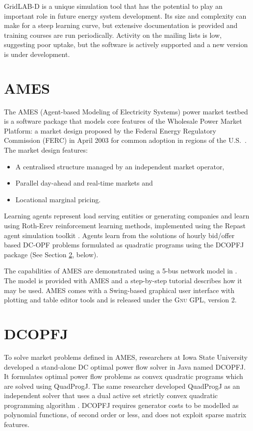 GridLAB-D is a unique simulation tool that has the potential to play an
important role in future energy system development.  Its size and complexity
can make for a steep learning curve, but extensive documentation is provided
and training courses are run periodically.  Activity on the mailing lists is low,
suggesting poor uptake, but the software is actively supported and a new
version is under development.

\section{AMES}
\label{sec:ames}
The AMES (Agent-based Modeling of Electricity Systems) power market testbed is
a software package that models core features of the Wholesale Power Market
Platform: a market design proposed by the Federal Energy Regulatory
Commission (FERC) in April 2003 for common adoption in regions of the
U.S.~\cite{tesfatsi:wpmp}. The market design features:
\begin{itemize}
  \item A centralised structure managed by an independent market operator,
  \item Parallel day-ahead and real-time markets and
  \item Locational marginal pricing.
\end{itemize}
Learning agents represent load serving entities or generating companies and
learn using Roth-Erev reinforcement learning methods,
implemented using the Repast agent simulation toolkit \cite{gieseler:thesis}.
Agents learn from the solutions of hourly bid/offer based
DC-OPF problems formulated as quadratic programs using the DCOPFJ package
\cite{tesfatsi:dcopf} (See Section \ref{sec:dcopfj}, below).

The capabilities of AMES are demonstrated using a 5-bus network model in
.  The model is provided with AMES and a step-by-step
tutorial describes how it may be used.  AMES comes with a
Swing-based graphical user interface with plotting and table editor tools and
is released under the \textsc{Gnu} GPL, version 2.

\section{DCOPFJ}
\label{sec:dcopfj}
To solve market problems defined in AMES, researchers at Iowa State University
developed a stand-alone DC optimal power flow solver in Java named DCOPFJ.
It formulates optimal power flow problems as convex quadratic programs
which are solved using QuadProgJ.  The same researcher developed QuadProgJ as
an independent solver that uses a dual active set strictly convex quadratic
programming algorithm \cite{goldfarb:scqp}.  DCOPFJ requires
generator costs to be modelled as polynomial functions, of second order or
less, and does not exploit sparse matrix features.

